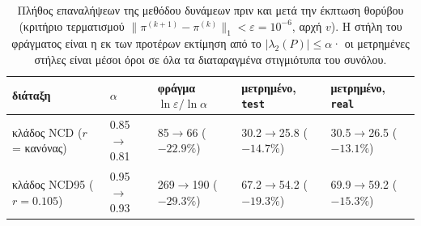 \begin{table}[t]
\centering
\small
\caption{Πλήθος επαναλήψεων της μεθόδου δυνάμεων πριν και μετά την έκπτωση θορύβου (κριτήριο τερματισμού $\|\pi^{(k+1)}-\pi^{(k)}\|_1<\varepsilon=10^{-6}$, αρχή $v$). Η στήλη του φράγματος είναι η εκ των προτέρων εκτίμηση από το $|\lambda_2(P)|\le\alpha$· οι μετρημένες στήλες είναι μέσοι όροι σε όλα τα διαταραγμένα στιγμιότυπα του συνόλου.}
\label{tab:conv}
\begin{tabular}{@{}lllll@{}}
\toprule
διάταξη & $\alpha$ & φράγμα $\ln\varepsilon/\ln\alpha$ & μετρημένο, \texttt{test} & μετρημένο, \texttt{real} \\
\midrule
κλάδος NCD ($r$ = κανόνας) & 0.85$\to$0.81 & 85$\to$66 ($-22.9\%$) & 30.2$\to$25.8 ($-14.7\%$) & 30.5$\to$26.5 ($-13.1\%$) \\
κλάδος NCD95 ($r=0.105$) & 0.95$\to$0.93 & 269$\to$190 ($-29.3\%$) & 67.2$\to$54.2 ($-19.3\%$) & 69.9$\to$59.2 ($-15.3\%$) \\
\bottomrule
\end{tabular}
\end{table}
